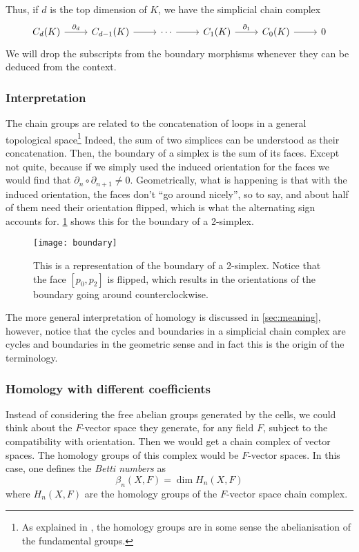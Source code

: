 \documentclass[../main.tex]{subfiles}
\begin{document}
Thus, if \( d \) is the top dimension of \( K \), we have the
simplicial chain complex
\begin{equation*}
	\begin{tikzcd}
		C_d(K) \arrow[r, "\partial_d"] & C_{d-1}(K) \arrow[r] & \cdots \arrow[r] & C_1(K)
		\arrow[r, "\partial_1"] & C_0(K) \arrow[r] & 0 
	\end{tikzcd}
\end{equation*}
We will drop the subscripts from the boundary morphisms whenever they can be deduced from
the context. 

\subsubsection{Interpretation}
The chain groups are related to the concatenation of loops in a general topological
space\footnote{As explained in \cite{hatcher}, the homology groups are in some sense the
abelianisation of the fundamental groups.} Indeed, the sum of two simplices can be
understood as their concatenation. Then, the boundary of a simplex is the sum of its
faces. Except not quite, because if we simply used the induced orientation for the faces
we would find that \( \partial_{n} \circ \partial_{n+1} \neq 0 \). Geometrically, what is
happening is that with the induced orientation, the faces don't ``go around nicely'', so
to say, and about half of them need their orientation flipped, which is what the
alternating sign accounts for. \cref{fig:boundary} shows this for the boundary of a
2-simplex.
\begin{figure}[htb]
	\centering
	\texttt{[image: boundary]}
	\caption{This is a representation of the boundary of a 2-simplex. Notice that the face
		\( [p_0, p_2] \) is flipped, which results in the orientations of the boundary going
	around counterclockwise.}
	\label{fig:boundary}
\end{figure}
The more general interpretation of homology is discussed in \cref{sec:meaning}, however,
notice that the cycles and boundaries in a simplicial chain complex are cycles and
boundaries in the geometric sense and in fact this is the origin of the terminology. 

\subsubsection{Homology with different coefficients} \label{sec:different coefficients}
Instead of considering the free abelian groups generated by the cells, we could think
about the \( F \)-vector space they generate, for any field \( F \), subject to the
compatibility with orientation. Then we would get a chain complex of vector spaces. The
homology groups of this complex would be \( F \)-vector spaces. In this case, one defines
the \emph{Betti numbers} as
\begin{equation*}
	\beta_n(X, F) = \dim H_n(X, F)
\end{equation*}
where \( H_n(X, F) \) are the homology groups of the \( F \)-vector space chain
complex. 
\end{document}
